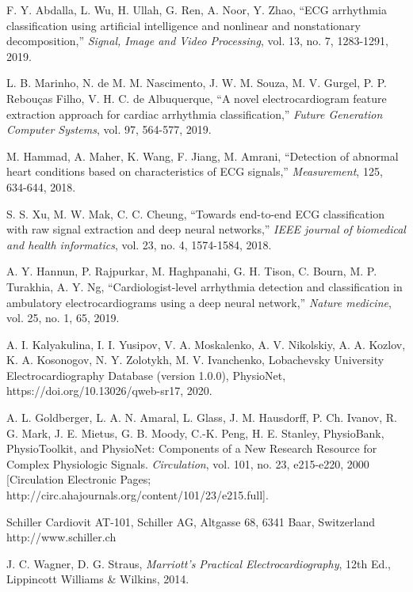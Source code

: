 \documentclass[submitted]{ieeeaccess}
\newcommand{\NewCorrection}[1]{{#1}}
\begin{document}
\begin{thebibliography}{99}
	\NewCorrection{F. Y. Abdalla, L. Wu, H. Ullah, G. Ren, A. Noor, Y. Zhao, ``ECG arrhythmia classification using artificial intelligence and nonlinear and nonstationary decomposition,'' \emph{Signal, Image and Video Processing}, vol. 13, no. 7, 1283-1291, 2019.}

	\NewCorrection{L. B. Marinho, N. de M. M. Nascimento, J. W. M. Souza, M. V. Gurgel, P. P. Rebouças Filho, V. H. C. de Albuquerque, ``A novel electrocardiogram feature extraction approach for cardiac arrhythmia classification,'' \emph{Future Generation Computer Systems}, vol. 97, 564-577, 2019.}
	
	\NewCorrection{M. Hammad, A. Maher, K. Wang, F. Jiang, M. Amrani, ``Detection of abnormal heart conditions based on characteristics of ECG signals,'' \emph{Measurement}, 125, 634-644, 2018.}
	
	
	\NewCorrection{S. S. Xu, M. W. Mak, C. C. Cheung, ``Towards end-to-end ECG classification with raw signal extraction and deep neural networks,'' \emph{IEEE journal of biomedical and health informatics}, vol. 23, no. 4, 1574-1584, 2018.}
	
	\NewCorrection{A. Y. Hannun, P. Rajpurkar, M. Haghpanahi, G. H. Tison, C. Bourn, M. P. Turakhia, A. Y. Ng, ``Cardiologist-level arrhythmia detection and classification in ambulatory electrocardiograms using a deep neural network,'' \emph{Nature medicine}, vol. 25, no. 1, 65, 2019.}

    A. I. Kalyakulina, I. I. Yusipov, V. A. Moskalenko, A. V. Nikolskiy, A. A. Kozlov, K. A. Kosonogov, N. Y. Zolotykh, M. V. Ivanchenko, Lobachevsky University Electrocardiography Database (version 1.0.0), PhysioNet, https://doi.org/10.13026/qweb-sr17, 2020.

	\NewCorrection{A. L. Goldberger, L. A. N. Amaral, L. Glass, J. M. Hausdorff, P. Ch. Ivanov, R. G. Mark, J. E. Mietus, G. B. Moody, C.-K. Peng, H. E. Stanley, PhysioBank, PhysioToolkit, and PhysioNet: Components of a New Research Resource for Complex Physiologic Signals. \emph{Circulation}, vol. 101, no. 23, e215-e220, 2000 [Circulation Electronic Pages; http://circ.ahajournals.org/content/101/23/e215.full].}

	 Schiller Cardiovit AT-101, Schiller AG, Altgasse 68, 6341 Baar, Switzerland http://www.schiller.ch
	
	 J. C. Wagner, D. G. Straus, \emph{Marriott's Practical Electrocardiography}, 12th Ed., Lippincott Williams \& Wilkins, 2014. 
	

\end{thebibliography}
\end{document}

